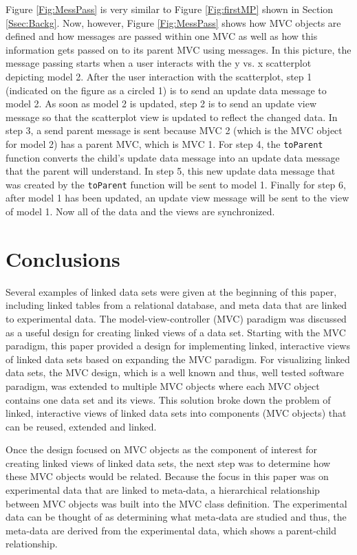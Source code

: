 \documentclass{article}[11pt]
\newcommand{\Rfunction}[1]{{\texttt{#1}}}
\begin{document}
Figure \ref{Fig:MessPass} is very similar to Figure \ref{Fig:firstMP} shown in
Section \ref{Ssec:Backg}.  Now, however, Figure \ref{Fig:MessPass} shows how
MVC objects are defined and how messages are passed within one MVC as well
as how this information gets passed on to its parent MVC using messages.  In
this picture, the message passing starts when a user interacts with the y
vs. x scatterplot depicting model 2.  After the user interaction with the
scatterplot, step 1 (indicated on the figure as a circled 1) is to send an
update data message to model 2.  As soon as model 2 is updated, step 2 is to
send an update view message so that the scatterplot view is updated to reflect
the changed data.  In step 3, a send parent message is sent because MVC 2
(which is the MVC object for model 2) has a parent MVC, which is MVC 1.  For
step 4, the \Rfunction{toParent} function converts the child's update data
message into an update data message that the parent will understand.  In step
5, this new update data message that was created by the \Rfunction{toParent}
function will be sent to model 1.  Finally for step 6, after model 1 has been
updated, an update view message will be sent to the view of model 1.  Now all
of the data and the views are synchronized.

\section{Conclusions}\label{Sec:Conc}

Several examples of linked data sets were given at the beginning of this
paper, including linked tables from a relational database, and meta data that
are linked to experimental data.  The model-view-controller (MVC) paradigm was
discussed as a useful design for creating linked views of a data set.
Starting with the MVC paradigm, this paper provided a design for implementing
linked, interactive views of linked data sets based on expanding the MVC
paradigm.  For visualizing linked data sets, the MVC design, which is a well
known and thus, well tested software paradigm, was extended to multiple MVC
objects where each MVC object contains one data set and its views.  This
solution broke down the problem of linked, interactive views of linked data
sets into components (MVC objects) that can be reused, extended and linked.

Once the design focused on MVC objects as the component of interest for
creating linked views of linked data sets, the next step was to determine how
these MVC objects would be related.  Because the focus in this paper was on
experimental data that are linked to meta-data, a hierarchical relationship
between MVC objects was built into the MVC class definition.  The experimental
data can be thought of as determining what meta-data are studied and thus, the
meta-data are derived from the experimental data, which shows a parent-child
relationship.  
 
\end{document}
